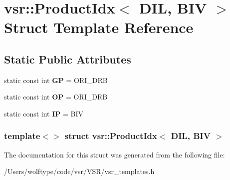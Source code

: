 \hypertarget{structvsr_1_1_product_idx_3_01_d_i_l_00_01_b_i_v_01_4}{\section{vsr\-:\-:Product\-Idx$<$ D\-I\-L, B\-I\-V $>$ Struct Template Reference}
\label{structvsr_1_1_product_idx_3_01_d_i_l_00_01_b_i_v_01_4}
}
\subsection*{Static Public Attributes}
\begin{DoxyCompactItemize}
\item 
\hypertarget{structvsr_1_1_product_idx_3_01_d_i_l_00_01_b_i_v_01_4_ae243d35c71d7d6f991fc1c30c247fa61}{static const int {\bfseries G\-P} = O\-R\-I\-\_\-\-D\-R\-B}\label{structvsr_1_1_product_idx_3_01_d_i_l_00_01_b_i_v_01_4_ae243d35c71d7d6f991fc1c30c247fa61}

\item 
\hypertarget{structvsr_1_1_product_idx_3_01_d_i_l_00_01_b_i_v_01_4_ab3fa825a4525150c7acdb1a5328d17cc}{static const int {\bfseries O\-P} = O\-R\-I\-\_\-\-D\-R\-B}\label{structvsr_1_1_product_idx_3_01_d_i_l_00_01_b_i_v_01_4_ab3fa825a4525150c7acdb1a5328d17cc}

\item 
\hypertarget{structvsr_1_1_product_idx_3_01_d_i_l_00_01_b_i_v_01_4_ab6ad887adeac826dc7a82ff7d4b5fb44}{static const int {\bfseries I\-P} = B\-I\-V}\label{structvsr_1_1_product_idx_3_01_d_i_l_00_01_b_i_v_01_4_ab6ad887adeac826dc7a82ff7d4b5fb44}

\end{DoxyCompactItemize}
\subsubsection*{template$<$$>$ struct vsr\-::\-Product\-Idx$<$ D\-I\-L, B\-I\-V $>$}



The documentation for this struct was generated from the following file\-:\begin{DoxyCompactItemize}
\item 
/\-Users/wolftype/code/vsr/\-V\-S\-R/vsr\-\_\-templates.\-h\end{DoxyCompactItemize}
